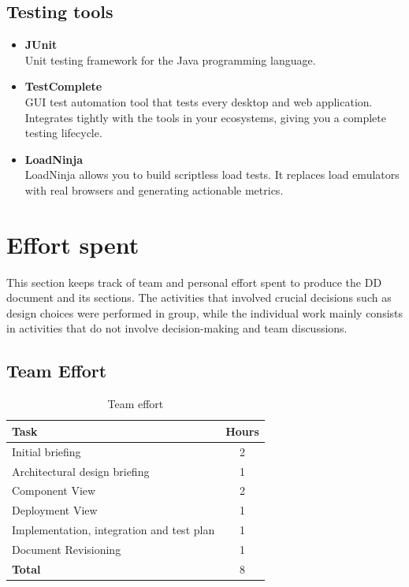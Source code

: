 \documentclass[10pt]{article} %
\begin{document}
\subsection{Testing tools}
\begin{itemize}
    \item \textbf{JUnit}\\Unit testing framework for the Java programming language.
    \item \textbf{TestComplete}\\GUI test automation tool that tests every desktop and web application. Integrates tightly with 
    the tools in your ecosystems, giving you a complete testing lifecycle.
    \item \textbf{LoadNinja}\\LoadNinja allows you to build scriptless load tests. It replaces load emulators with real browsers and generating actionable metrics.
\end{itemize}
\newpage
\section{Effort spent}
This section keeps track of team and personal effort spent to produce the DD document and its sections. The activities that involved crucial decisions such as design choices were
performed in group, while the individual work mainly consists in activities that do not involve decision-making and team discussions.
\subsection{Team Effort}
\begin{table}[h!]
    \begin{center}
    \begin{tabular}{|l|c|}
    \hline
    \textbf{Task} & \textbf{Hours} \\
    \hline
    Initial briefing & 2 \\
    Architectural design briefing & 1 \\
    Component View & 2 \\
    Deployment View & 1 \\
    Implementation, integration and test plan & 1 \\
    Document Revisioning & 1 \\
    \hline
    \hline
    \textbf{Total} & 8 \\
    \hline
    \end{tabular}
    \end{center}
    \caption{Team effort}
\end{table}
\end{document}
